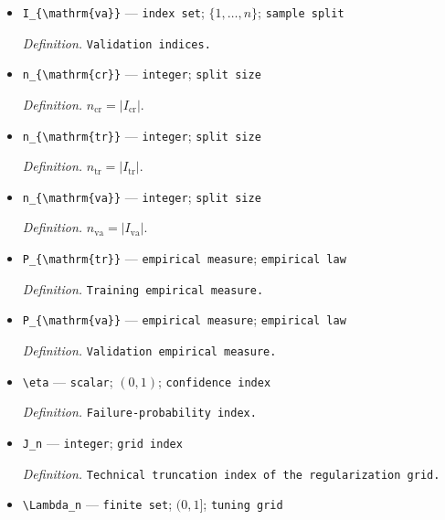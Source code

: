 \documentclass{article}
\begin{document}
\begin{itemize}
  \item \texttt{I\_\allowbreak{}\{\textbackslash{}\allowbreak{}mathrm\{va\}\allowbreak{}\}\allowbreak{}} --- \texttt{index set}; \(\{1,\ldots,n\}\); \texttt{sample split}
  \par\smallskip\noindent\emph{Definition.} \texttt{Validation indices.}
  \item \texttt{n\_\allowbreak{}\{\textbackslash{}\allowbreak{}mathrm\{cr\}\allowbreak{}\}\allowbreak{}} --- \texttt{integer}; \texttt{split size}
  \par\smallskip\noindent\emph{Definition.} \(n_{\mathrm{cr}}=|I_{\mathrm{cr}}|\).
  \item \texttt{n\_\allowbreak{}\{\textbackslash{}\allowbreak{}mathrm\{tr\}\allowbreak{}\}\allowbreak{}} --- \texttt{integer}; \texttt{split size}
  \par\smallskip\noindent\emph{Definition.} \(n_{\mathrm{tr}}=|I_{\mathrm{tr}}|\).
  \item \texttt{n\_\allowbreak{}\{\textbackslash{}\allowbreak{}mathrm\{va\}\allowbreak{}\}\allowbreak{}} --- \texttt{integer}; \texttt{split size}
  \par\smallskip\noindent\emph{Definition.} \(n_{\mathrm{va}}=|I_{\mathrm{va}}|\).
  \item \texttt{P\_\allowbreak{}\{\textbackslash{}\allowbreak{}mathrm\{tr\}\allowbreak{}\}\allowbreak{}} --- \texttt{empirical measure}; \texttt{empirical law}
  \par\smallskip\noindent\emph{Definition.} \texttt{Training empirical measure.}
  \item \texttt{P\_\allowbreak{}\{\textbackslash{}\allowbreak{}mathrm\{va\}\allowbreak{}\}\allowbreak{}} --- \texttt{empirical measure}; \texttt{empirical law}
  \par\smallskip\noindent\emph{Definition.} \texttt{Validation empirical measure.}
  \item \texttt{\textbackslash{}\allowbreak{}eta} --- \texttt{scalar}; \((0,1)\); \texttt{confidence index}
  \par\smallskip\noindent\emph{Definition.} \texttt{Failure-\allowbreak{}probability index.}
  \item \texttt{J\_\allowbreak{}n} --- \texttt{integer}; \texttt{grid index}
  \par\smallskip\noindent\emph{Definition.} \texttt{Technical truncation index of the regularization grid.}
  \item \texttt{\textbackslash{}\allowbreak{}Lambda\_\allowbreak{}n} --- \texttt{finite set}; \((0,1]\); \texttt{tuning grid}

\end{itemize}
\end{document}
